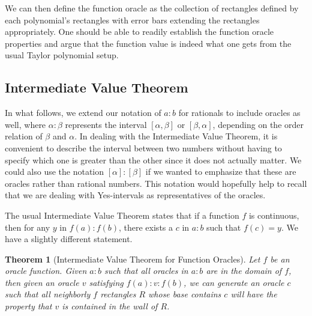 \documentclass[12pt]{article}
\newtheorem{theorem}{Theorem}[section]
\begin{document}
We can then define the function oracle as the collection of rectangles defined by each polynomial's rectangles with error bars extending the rectangles appropriately. One should be able to readily establish the function oracle properties and argue that the function value is indeed what one gets from the usual Taylor polynomial setup. 



\subsection{Intermediate Value Theorem}

In what follows, we extend our notation of $a:b$ for rationals to include oracles as well, where $\alpha : \beta$ represents the interval $[\alpha,\beta]$ or $[\beta, \alpha]$, depending on the order relation of $\beta$ and $\alpha$. In dealing with the Intermediate Value Theorem, it is convenient to describe the interval between two numbers without having to specify which one is greater than the other since it does not actually matter. We could also use the notation $[\alpha]:[\beta]$ if we wanted to emphasize that these are oracles rather than rational numbers. This notation would hopefully help to recall that we are dealing with Yes-intervals as representatives of the oracles.

The usual Intermediate Value Theorem states that if a function $f$ is continuous, then for any $y$ in $f(a):f(b)$, there exists a $c$ in $a:b$ such that $f(c) = y$. We have a slightly different statement.

\begin{theorem}[Intermediate Value Theorem for Function Oracles]
Let $f$ be an oracle function. Given $a:b$ such that all oracles in $a:b$ are in the domain of $f$, then given an oracle $v$ satisfying $f(a):v:f(b)$, we can generate an oracle $c$ such that all neighborly $f$ rectangles $R$ whose base contains $c$ will have the property that $v$ is contained in the wall of $R$.
\end{theorem}
\end{document}
